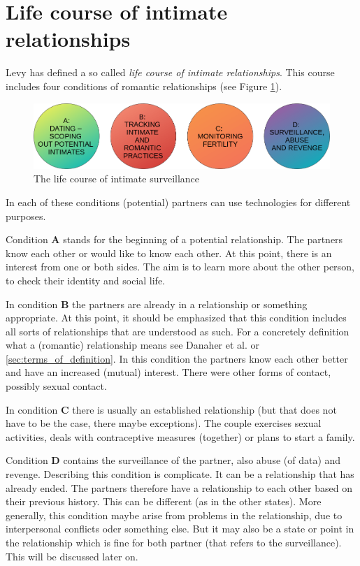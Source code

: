 \section{Life course of intimate relationships}

Levy \cite{levy2014intimate} has defined a so called \textit{life course of intimate relationships}. This course includes four conditions of romantic relationships (see Figure \ref{fig:live_course}).
\begin{figure}[htb]
    \centering
	\includegraphics[width=\linewidth]{img/life_course_of_intimate_surveillance.png}
	\caption{The life course of intimate surveillance}
	\label{fig:live_course}
\end{figure}

In each of these conditions (potential) partners can use technologies for different purposes.

Condition \textbf{A} stands for the beginning of a potential relationship. The partners know each other or would like to know each other. At this point, there is an interest from one or both sides. The aim is to learn more about the other person, to check their identity and social life.

In condition \textbf{B} the partners are already in a relationship or something appropriate. At this point, it should be emphasized that this condition includes all sorts of relationships that are understood as such. For a concretely definition what a (romantic) relationship means see Danaher et al. \cite{doi:10.1080/15265161.2017.1409823} or \ref{sec:terms_of_definition}. In this condition the partners know each other better and have an increased (mutual) interest. There were other forms of contact, possibly sexual contact.

In condition \textbf{C} there is usually an established relationship (but that does not have to be the case, there maybe exceptions). The couple exercises sexual activities, deals with contraceptive measures (together) or plans to start a family.

Condition \textbf{D} contains the surveillance of the partner, also abuse (of data) and revenge. Describing this condition is complicate. 
It can be a relationship that has already ended. The partners therefore have a relationship to each other based on their previous history. This can be different (as in the other states). More generally, this condition maybe arise from problems in the relationship, due to interpersonal conflicts oder something else. But it may also be a state or point in the relationship which is fine for both partner (that refers to the surveillance). This will be discussed later on.

